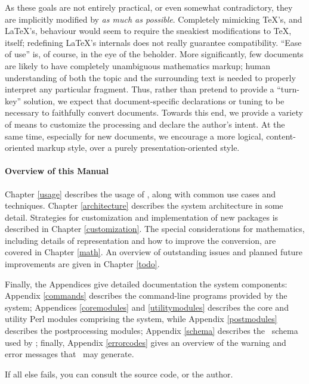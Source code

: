 \documentclass{book}
\begin{document}
As these goals are not entirely practical, or even somewhat contradictory,
they are implicitly modified by \emph{as much as possible}.
Completely mimicking \TeX's, and \LaTeX's, behaviour would seem to require the
sneakiest modifications to \TeX, itself; redefining \LaTeX's internals does 
not really guarantee compatibility. ``Ease of use'' is, of course, in the eye of the beholder.
More significantly, few documents are likely to have completely unambiguous
mathematics markup; human understanding of both the topic and the surrounding 
text is needed to properly interpret any particular fragment.
Thus, rather than pretend to provide a ``turn-key'' solution,
we expect that document-specific declarations or tuning to be necessary
to faithfully convert documents.  Towards this end, we provide a variety
of means to customize the processing and declare the author's intent.
At the same time, especially for new documents, we encourage a more logical, 
content-oriented markup style, over a purely presentation-oriented style.

\paragraph[Overview]{Overview of this Manual}
Chapter \ref{usage} describes the usage of \LaTeXML, along with
common use cases and techniques.  Chapter \ref{architecture} describes
the system architecture in some detail. Strategies for customization
and implementation of new packages is described in Chapter \ref{customization}.
The special considerations for mathematics, including details of representation
and how to improve the conversion, are covered in Chapter \ref{math}.
An overview of outstanding issues and planned future improvements
are given in Chapter \ref{todo}.

Finally, the Appendices give detailed documentation the system components:
Appendix \ref{commands} describes the command-line programs provided by the system;
Appendices \ref{coremodules} and \ref{utilitymodules} describes the core and utility Perl modules 
comprising the system, while Appendix \ref{postmodules} describes the postprocessing modules;
Appendix \ref{schema} describes the \XML\ schema used by \LaTeXML;
finally, Appendix \ref{errorcodes} gives an overview of the warning and
error messages that \LaTeXML\ may generate.

If all else fails, you can consult the source code, or the author.

\end{document}
